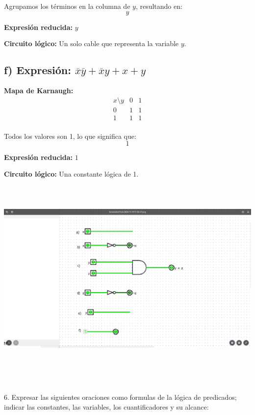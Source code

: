 \documentclass[11pt,letterpaper]{article}
\begin{document}
Agrupamos los términos en la columna de \( y \), resultando en:
\[
y
\]

\textbf{Expresión reducida:} \( y \)

\textbf{Circuito lógico:} Un solo cable que representa la variable \( y \).

\subsection*{f) Expresión: \( \overline{x}\overline{y} + \overline{x}y + x + y \)}

\textbf{Mapa de Karnaugh:}
\[
\begin{array}{c|cc}
x \setminus y & 0 & 1 \\
\hline
0 & 1 & 1 \\
1 & 1 & 1 \\
\end{array}
\]

Todos los valores son 1, lo que significa que:
\[
1
\]

\textbf{Expresión reducida:} \( 1 \)

\textbf{Circuito lógico:} Una constante lógica de 1.

\includegraphics[height=10.0cm]{./imagenes/circuitos.png}












\section{}6. Expresar las siguientes oraciones como formulas de la lógica de predicados; indicar las constantes, las variables, los cuantificadores y su alcance:
\end{document}
